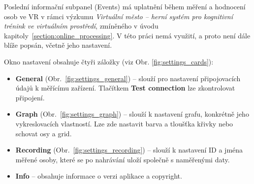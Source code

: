 Poslední informační subpanel (Events) má uplatnění během měření a hodnocení osob
ve VR v rámci výzkumu \textit{Virtuální město – herní systém pro kognitivní
trénink ve virtuálním prostředí}, zmíněného v úvodu
kapitoly~\ref{section:online_processing}. V této práci nemá využití, a proto
není dále blíže popsán, včetně jeho nastavení.

Okno nastavení obsahuje čtyři záložky (viz Obr. \ref{fig:settings_cards}):
\begin{itemize}
    \item \textbf{General} (Obr.~\ref{fig:settings_general}) -- slouží pro
          nastavení připojovacích údajů k měřícímu zařízení. Tlačítkem \textbf{Test
              connection} lze zkontrolovat připojení.
    \item \textbf{Graph} (Obr.~\ref{fig:settings_graph}) -- slouží k nastavení
          grafu, konkrétně jeho vykreslovacích vlastností. Lze zde nastavit barva a
          tloušťka křivky nebo schovat osy a grid.
    \item \textbf{Recording} (Obr.~\ref{fig:settings_recording}) -- slouží k
          nastavení ID a jména měřené osoby, které se po nahrávání uloží
          společně s naměřenými daty.
    \item \textbf{Info} -- obsahuje informace o verzi aplikace a copyright.
\end{itemize}

